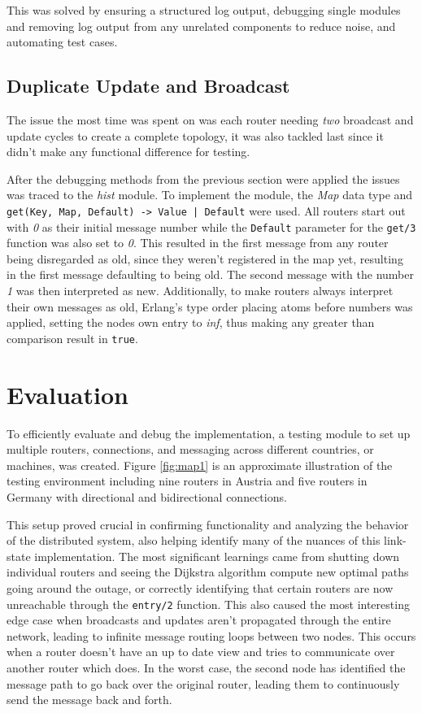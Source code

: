 \documentclass[a4paper, 11pt]{article}
\begin{document}
This was solved by ensuring a structured log output, debugging single modules and removing log output from any unrelated components to reduce noise, and automating test cases.

\subsection{Duplicate Update and Broadcast}

The issue the most time was spent on was each router needing \textit{two} broadcast and update cycles to create a complete topology, it was also tackled last since it didn't make any functional difference for testing.

After the debugging methods from the previous section were applied the issues was traced to the \textit{hist} module.
To implement the module, the \textit{Map} data type and \texttt{get(Key, Map, Default) -> Value | Default} were used.
All routers start out with \textit{0} as their initial message number while the \texttt{Default} parameter for the \texttt{get/3} function was also set to \textit{0}.
This resulted in the first message from any router being disregarded as old, since they weren't registered in the map yet, resulting in the first message defaulting to being old. The second message with the number \textit{1} was then interpreted as new.
Additionally, to make routers always interpret their own messages as old, Erlang's type order placing atoms before numbers was applied, setting the nodes own entry to \textit{inf}, thus making any greater than comparison result in \texttt{true}.

\section{Evaluation}

To efficiently evaluate and debug the implementation, a testing module to set up multiple routers, connections, and messaging across different countries, or machines, was created.
Figure \ref{fig:map1} is an approximate illustration of the testing environment including nine routers in Austria and five routers in Germany with directional and bidirectional connections.

This setup proved crucial in confirming functionality and analyzing the behavior of the distributed system, also helping identify many of the nuances of this link-state implementation. 
The most significant learnings came from shutting down individual routers and seeing the Dijkstra algorithm compute new optimal paths going around the outage, or correctly identifying that certain routers are now unreachable through the \texttt{entry/2} function.
This also caused the most interesting edge case when broadcasts and updates aren't propagated through the entire network, leading to infinite message routing loops between two nodes.
This occurs when a router doesn't have an up to date view and tries to communicate over another router which does. In the worst case, the second node has identified the message path to go back over the original router, leading them to continuously send the message back and forth.
\end{document}

